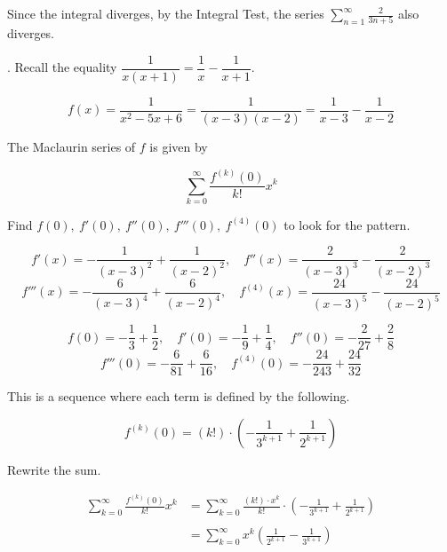 \documentclass{article}
\begin{document}
\noindent Since the integral diverges, by the Integral Test, the series $\displaystyle\sum_{n=1}^{\infty}\frac2{3n+5}$ also diverges.

\hfill

. Recall the equality $\dfrac1{x(x+1)}=\dfrac1{x}-\dfrac1{x+1}$.

\hfill

\[f(x)=\frac1{x^2-5x+6}=\frac1{(x-3)(x-2)}=\frac1{x-3}-\frac1{x-2}\]

\hfill

\noindent The Maclaurin series of $f$ is given by

\[\sum_{k=0}^{\infty}\frac{f^{(k)}(0)}{k!}x^k\]

\hfill

\noindent Find $f(0),\:f'(0),\:f''(0),\:f'''(0),\:f^{(4)}(0)$ to look for the pattern.

\[f'(x)=-\frac1{(x-3)^2}+\frac1{(x-2)^2},\quad f''(x)=\frac2{(x-3)^3}-\frac2{(x-2)^3}\]
\[f'''(x)=-\frac6{(x-3)^4}+\frac6{(x-2)^4},\quad f^{(4)}(x)=\frac{24}{(x-3)^5}-\frac{24}{(x-2)^5}\]

\hfill

\[f(0)=-\frac13+\frac12,\quad f'(0)=-\frac19+\frac14,\quad f''(0)=-\frac2{27}+\frac28\]
\[f'''(0)=-\frac6{81}+\frac6{16},\quad f^{(4)}(0)=-\frac{24}{243}+\frac{24}{32}\]

\hfill

\noindent This is a sequence where each term is defined by the following.

\[f^{(k)}(0)=(k!)\cdot\left(-\frac1{3^{k+1}}+\frac1{2^{k+1}}\right)\]

\hfill

\noindent Rewrite the sum.

\begin{align*}\sum_{k=0}^{\infty}\frac{f^{(k)}(0)}{k!}x^k&=\sum_{k=0}^{\infty}\frac{(k!)\cdot x^k}{k!}\cdot\left(-\frac1{3^{k+1}}+\frac1{2^{k+1}}\right)\\\\&=\boxed{\sum_{k=0}^{\infty}x^k\left(\frac1{2^{k+1}}-\frac1{3^{k+1}}\right)}\end{align*}
\end{document}

